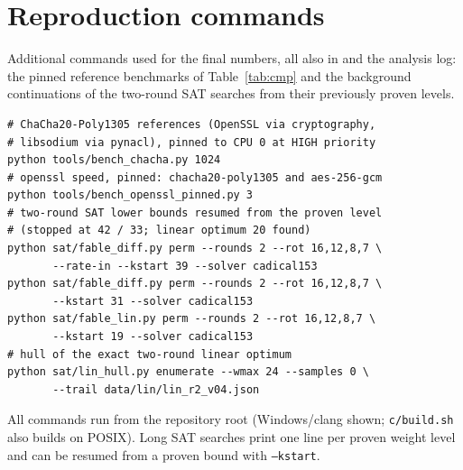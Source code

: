 \documentclass{iacrtrans}
\begin{document}
\section{Reproduction commands}
\label{app:repro}
Additional commands used for the final numbers, all also in  and the analysis log: the pinned reference benchmarks of Table~\ref{tab:cmp} and the background continuations of the two-round SAT searches from their previously proven levels.
\begin{verbatim}
# ChaCha20-Poly1305 references (OpenSSL via cryptography,
# libsodium via pynacl), pinned to CPU 0 at HIGH priority
python tools/bench_chacha.py 1024
# openssl speed, pinned: chacha20-poly1305 and aes-256-gcm
python tools/bench_openssl_pinned.py 3
# two-round SAT lower bounds resumed from the proven level
# (stopped at 42 / 33; linear optimum 20 found)
python sat/fable_diff.py perm --rounds 2 --rot 16,12,8,7 \
       --rate-in --kstart 39 --solver cadical153
python sat/fable_diff.py perm --rounds 2 --rot 16,12,8,7 \
       --kstart 31 --solver cadical153
python sat/fable_lin.py perm --rounds 2 --rot 16,12,8,7 \
       --kstart 19 --solver cadical153
# hull of the exact two-round linear optimum
python sat/lin_hull.py enumerate --wmax 24 --samples 0 \
       --trail data/lin/lin_r2_v04.json
\end{verbatim}
All commands run from the repository root (Windows/clang shown; \texttt{c/build.sh} also builds on POSIX). Long SAT searches print one line per proven weight level and can be resumed from a proven bound with \texttt{--kstart}.
\end{document}

